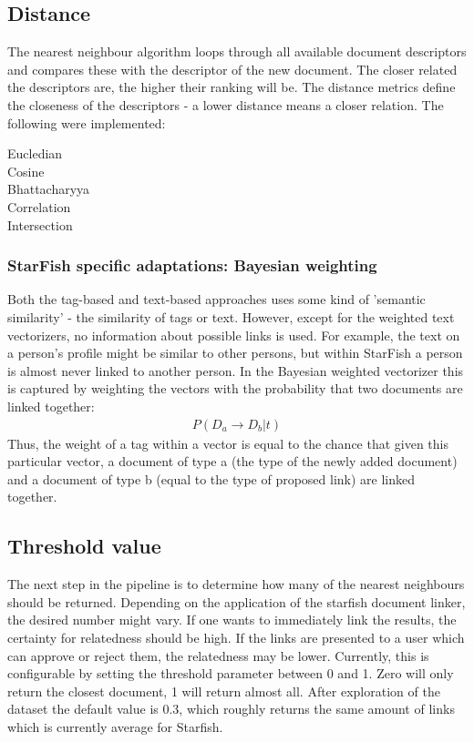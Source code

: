 \subsection{Distance}
The nearest neighbour algorithm loops through all available document descriptors and compares these with the descriptor of the new document. The closer related the descriptors are, the higher their ranking will be. The distance metrics define the closeness of the descriptors - a lower distance means a closer relation. The following were implemented:

\begin{description}
\item[Eucledian]
\item[Cosine]
\item[Bhattacharyya]
\item[Correlation]
\item[Intersection]
\end{description}

\subsubsection{StarFish specific adaptations: Bayesian weighting}
Both the tag-based and text-based approaches uses some kind of 'semantic similarity' - the similarity of tags or text. However, except for the weighted text vectorizers, no information about possible links is used. For example, the text on a person's profile might be similar to other persons, but within StarFish a person is almost never linked to another person. In the Bayesian weighted vectorizer this is captured by weighting the vectors with the probability that two documents are linked together:
\begin{align}
\nonumber P(D_a \rightarrow D_b | t)
\end{align}
Thus, the weight of a tag within a vector is equal to the chance that given this particular vector, a document of type a (the type of the newly added document) and a document of type b (equal to the type of proposed link) are linked together.

\subsection{Threshold value}
The next step in the pipeline is to determine how many of the nearest neighbours should be returned. Depending on the application of the starfish document linker, the desired number might vary. If one wants to immediately link the results, the certainty for relatedness should be high. If the links are presented to a user which can approve or reject them, the relatedness may be lower. Currently, this is configurable by setting the threshold parameter between 0 and 1. Zero will only return the closest document, 1 will return almost all. After exploration of the dataset the default value is 0.3, which roughly returns the same amount of links which is currently average for Starfish.
